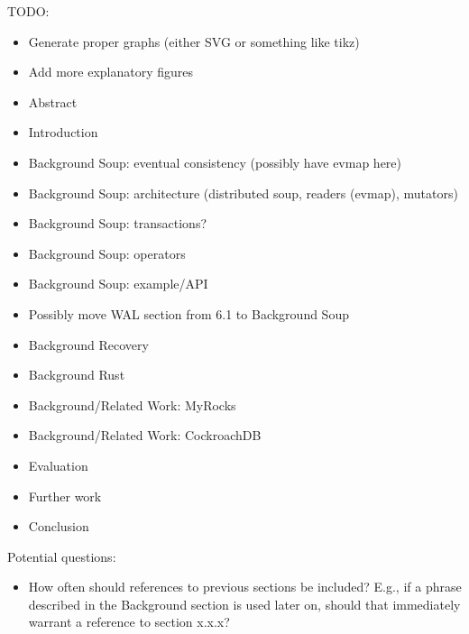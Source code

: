 \color{purple}
TODO:
\begin{itemize}
  \item Generate proper graphs (either SVG or something like tikz)
  \item Add more explanatory figures

  \item Abstract
  \item Introduction

  \item Background Soup: eventual consistency (possibly have evmap here)
  \item Background Soup: architecture (distributed soup, readers (evmap), mutators)
  \item Background Soup: transactions?
  \item Background Soup: operators
  \item Background Soup: example/API
  \item Possibly move WAL section from 6.1 to Background Soup

  \item Background Recovery
  \item Background Rust

  \item Background/Related Work: MyRocks
  \item Background/Related Work: CockroachDB

  \item Evaluation
  \item Further work
  \item Conclusion
\end{itemize}

\color{purple}
Potential questions:
\begin{itemize}
  \item How often should references to previous sections be included? E.g., if a
    phrase described in the Background section is used later on, should that
    immediately warrant a reference to section x.x.x?
\end{itemize}
